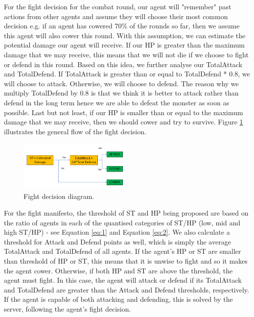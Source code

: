\par For the fight decision for the combat round, our agent will "remember" past actions from other agents and assume they will choose their most common decision e.g. if an agent has cowered 70\% of the rounds so far, then we assume this agent will also cower this round. With this assumption, we can estimate the potential damage our agent will receive. If our HP is greater than the maximum damage that we may receive, this means that we will not die if we choose to fight or defend in this round. Based on this idea, we further analyse our TotalAttack and TotalDefend. If TotalAttack is greater than or equal to TotalDefend * 0.8, we will choose to attack. Otherwise, we will choose to defend. The reason why we multiply TotalDefend by 0.8 is that we think it is better to attack rather than defend in the long term hence we are able to defeat the monster as soon as possible. Last but not least, if our HP is smaller than or equal to the maximum damage that we may receive, then we should cower and try to survive. Figure \ref{fig:fight1} illustrates the general flow of the fight decision.

\begin{figure}
    \centering
    \includegraphics[width=0.5\textwidth]{007_team_4_agent_design/figures/1_fight1.png}
    \caption{Fight decision diagram.}
    \label{fig:fight1}
\end{figure}


\par For the fight manifesto, the threshold of ST and HP being proposed are based on the ratio of agents in each of the quantised categories of ST/HP (low, mid and high ST/HP) - see Equation \ref{eq:1} and Equation \ref{eq:2}. We also calculate a threshold for Attack and Defend points as well, which is simply the average TotalAttack and TotalDefend of all agents.
If the agent's HP or ST are smaller than threshold of HP or ST, this means that it is unwise to fight and so it makes the agent cower. Otherwise, if both HP and ST are above the threshold, the agent must fight. In this case, the agent will attack or defend if its TotalAttack and TotalDefend are greater than the Attack and Defend thresholds, respectively. If the agent is capable of both attacking and defending, this is solved by the server, following the agent's fight decision.

